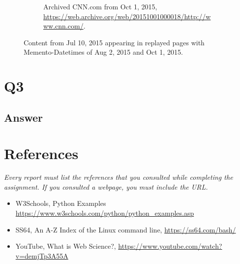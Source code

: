 \documentclass[12pt]{article}
\begin{document}
\begin{figure}[ht]
\begin{subfigure}{0.45\textwidth}
  \caption{Archived CNN.com from Oct 1, 2015, \url{https://web.archive.org/web/20151001000018/http://www.cnn.com/}.}
\label{fig:cnn-2015oct01}
\end{subfigure}%
\caption{Content from Jul 10, 2015 appearing in replayed pages with Memento-Datetimes of Aug 2, 2015 and Oct 1, 2015.}
\label{fig:subfigure-ex}
\end{figure}

\section*{Q3}

\subsection*{Answer}

\section*{References}

\emph{Every report must list the references that you consulted while completing the assignment. If you consulted a webpage, you must include the URL.}

\begin{itemize}
    \item {W3Schools, Python Examples \url{https://www.w3schools.com/python/python_examples.asp}}
    \item{SS64, An A-Z Index of the Linux command line, \url{https://ss64.com/bash/}}
    \item{YouTube, What is Web Science?, \url{https://www.youtube.com/watch?v=demjTp3A55A}}
\end{itemize}
\end{document}
